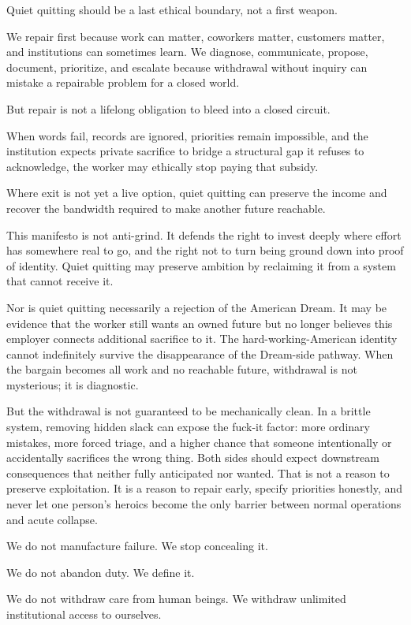 \documentclass[11pt,oneside]{article}
\begin{document}
Quiet quitting should be a last ethical boundary, not a first weapon.

We repair first because work can matter, coworkers matter, customers
matter, and institutions can sometimes learn. We diagnose, communicate,
propose, document, prioritize, and escalate because withdrawal without
inquiry can mistake a repairable problem for a closed world.

But repair is not a lifelong obligation to bleed into a closed circuit.

When words fail, records are ignored, priorities remain impossible, and
the institution expects private sacrifice to bridge a structural gap it
refuses to acknowledge, the worker may ethically stop paying that
subsidy.

Where exit is not yet a live option, quiet quitting can preserve the
income and recover the bandwidth required to make another future
reachable.

This manifesto is not anti-grind. It defends the right to invest deeply
where effort has somewhere real to go, and the right not to turn being
ground down into proof of identity. Quiet quitting may preserve ambition
by reclaiming it from a system that cannot receive it.

Nor is quiet quitting necessarily a rejection of the American Dream. It
may be evidence that the worker still wants an owned future but no longer
believes this employer connects additional sacrifice to it. The
hard-working-American identity cannot indefinitely survive the
disappearance of the Dream-side pathway. When the bargain becomes all
work and no reachable future, withdrawal is not mysterious; it is
diagnostic.

But the withdrawal is not guaranteed to be mechanically clean. In a
brittle system, removing hidden slack can expose the fuck-it factor:
more ordinary mistakes, more forced triage, and a higher chance that
someone intentionally or accidentally sacrifices the wrong thing. Both
sides should expect downstream consequences that neither fully
anticipated nor wanted. That is not a reason to preserve exploitation.
It is a reason to repair early, specify priorities honestly, and never
let one person's heroics become the only barrier between normal
operations and acute collapse.

We do not manufacture failure. We stop concealing it.

We do not abandon duty. We define it.

We do not withdraw care from human beings. We withdraw unlimited
institutional access to ourselves.
\end{document}
